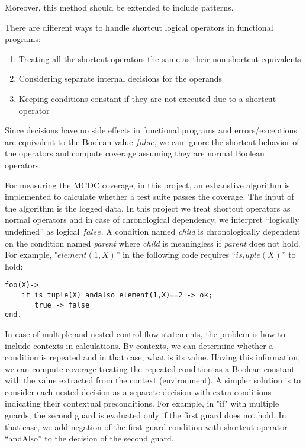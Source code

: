 \documentclass[12pt,a4paper]{report}
\begin{document}
Moreover, this method should be extended to include patterns.

There are different ways to handle shortcut logical operators in functional programs:

\begin{enumerate}
 \item Treating all the shortcut operators the same as their non-shortcut equivalents
 \item Considering separate internal decisions for the operands\cite{DO-248B} 
 \item Keeping conditions constant if they are not executed due to a shortcut operator\cite{chilenski1994applicability}
\end{enumerate}
 
Since decisions have no side effects in functional programs and errors/exceptions are equivalent to the Boolean value $false$, we can ignore the shortcut behavior of the operators and compute coverage assuming they are normal Boolean operators.  
 
For measuring the MCDC coverage, in this project, an exhaustive algorithm is implemented to calculate whether a test suite passes the coverage. The input of the algorithm is the logged data. In this project we treat shortcut operators as normal operators and in case of chronological dependency, we interpret “logically undefined” as logical $false$. A condition named \emph{child} is chronologically dependent on the condition named \emph{parent} where \emph{child} is meaningless if \emph{parent} does not hold. For example, "$element(1,X)$” in the following code requires “$is_tuple(X)$” to hold:

\begin{lstlisting}
foo(X)->
    if is_tuple(X) andalso element(1,X)==2 -> ok;
       true -> false
end.
\end{lstlisting} 

In case of multiple and nested control flow statements, the problem is how to include contexts in calculations. By contexts, we can determine whether a condition is repeated and in that case, what is its value. Having this information, we can compute coverage treating the repeated condition as a Boolean constant with the value extracted from the context (environment). A simpler solution is to consider each nested decision as a separate decision with extra conditions indicating their contextual preconditions. For example, in "if" with multiple guards, the second guard is evaluated only if the first guard does not hold. In that case, we add negation of the first guard condition with shortcut operator “andAlso” to the decision of the second guard.
\end{document}
